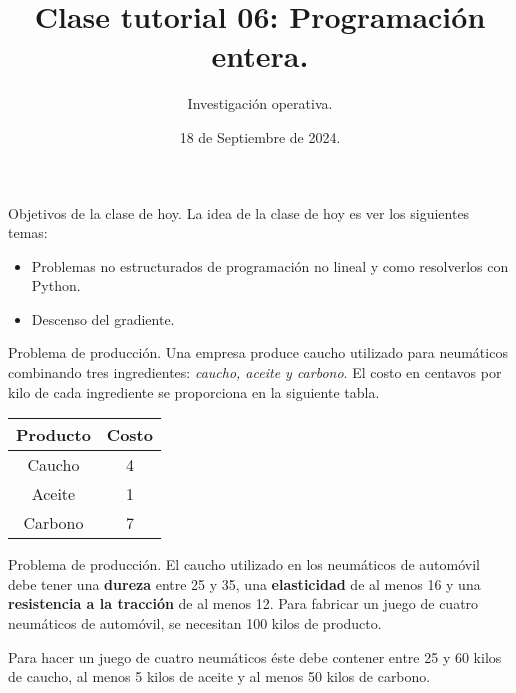 \documentclass{beamer}
\title[]{Clase tutorial 06: Programación entera.}
\date{18 de Septiembre de 2024.}
\author[]{ Investigación operativa.}
\institute{Universidad de San Andrés}
\begin{document}
\maketitle

\begin{frame}{Objetivos de la clase de hoy.}
  La idea de la clase de hoy es ver los siguientes temas:
  \begin{itemize}
    \item Problemas no estructurados de programación no lineal y como resolverlos con Python.
    \item Descenso del gradiente.
  \end{itemize}
\end{frame}


\begin{frame}[fragile]{Problema de producción.}
  Una empresa produce caucho utilizado para neumáticos combinando tres ingredientes: \emph{caucho, aceite y carbono}. 
  El costo en centavos por kilo de cada ingrediente se proporciona en la siguiente tabla.
  \pause 

  \begin{center}
    \begin{adjustbox}{width = 0.35 \textwidth}
        \begin{tabular}{|c |c |}
          \hline
          Producto & Costo \\ 
          \hline
          Caucho   & 4  \\
          Aceite   & 1  \\
          Carbono  & 7  \\
          \hline 
        \end{tabular}
    \end{adjustbox}
  \end{center}

  
\end{frame}

\begin{frame}[fragile]{Problema de producción.}
  El caucho utilizado en los neumáticos de automóvil debe tener una \textbf{dureza} entre 25 y 35, una \textbf{elasticidad} de al menos 16 y una \textbf{resistencia a la tracción} de al menos 12. 
  \pause 
  Para fabricar un juego de cuatro neumáticos de automóvil, se necesitan 100 kilos de producto. 

  Para hacer un juego de cuatro neumáticos éste debe contener entre 25 y 60 kilos de caucho, al menos 5 kilos de aceite y al menos 50 kilos de carbono.

\end{frame}
\end{document}
